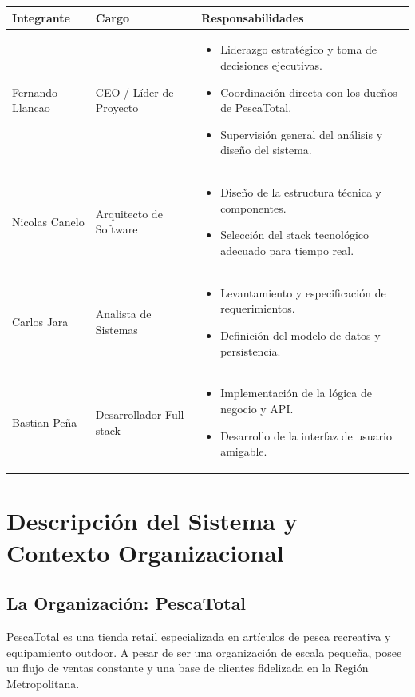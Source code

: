 \documentclass[12pt,a4paper]{article}
\begin{document}
\begin{table}[h]
\centering
\begin{tabularx}{\textwidth}{|l|l|X|}
\hline
\textbf{Integrante} & \textbf{Cargo} & \textbf{Responsabilidades} \\ \hline
Fernando Llancao & CEO / Líder de Proyecto & 
\begin{itemize}[nosep, leftmargin=*]
    \item Liderazgo estratégico y toma de decisiones ejecutivas.
    \item Coordinación directa con los dueños de PescaTotal.
    \item Supervisión general del análisis y diseño del sistema.
\end{itemize} \\ \hline
Nicolas Canelo & Arquitecto de Software & 
\begin{itemize}[nosep, leftmargin=*]
    \item Diseño de la estructura técnica y componentes.
    \item Selección del stack tecnológico adecuado para tiempo real.
\end{itemize} \\ \hline
Carlos Jara & Analista de Sistemas & 
\begin{itemize}[nosep, leftmargin=*]
    \item Levantamiento y especificación de requerimientos.
    \item Definición del modelo de datos y persistencia.
\end{itemize} \\ \hline
Bastian Peña & Desarrollador Full-stack & 
\begin{itemize}[nosep, leftmargin=*]
    \item Implementación de la lógica de negocio y API.
    \item Desarrollo de la interfaz de usuario amigable.
\end{itemize} \\ \hline
\end{tabularx}
\end{table}

\section{Descripción del Sistema y Contexto Organizacional}

\subsection{La Organización: PescaTotal}
PescaTotal es una tienda retail especializada en artículos de pesca recreativa y equipamiento outdoor. A pesar de ser una organización de escala pequeña, posee un flujo de ventas constante y una base de clientes fidelizada en la Región Metropolitana.
\end{document}
